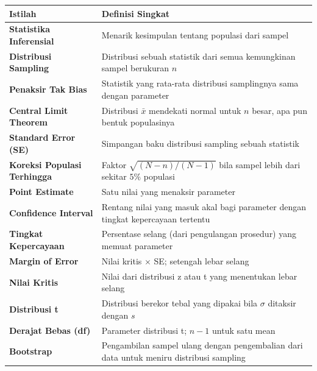 \documentclass[
  indonesian,
  letterpaper,
]{book}
\newcounter{none} %
\begin{document}
{\def\LTcaptype{none} %
\begin{longtable}[]{@{}
  >{\raggedright\arraybackslash}p{}
  >{\raggedright\arraybackslash}p{}@{}}
\toprule\noalign{}
\begin{minipage}[b]{\linewidth}\raggedright
Istilah
\end{minipage} & \begin{minipage}[b]{\linewidth}\raggedright
Definisi Singkat
\end{minipage} \\
\midrule\noalign{}
\endhead
\bottomrule\noalign{}
\endlastfoot
\textbf{Statistika Inferensial} & Menarik kesimpulan tentang populasi
dari sampel \\
\textbf{Distribusi Sampling} & Distribusi sebuah statistik dari semua
kemungkinan sampel berukuran \(n\) \\
\textbf{Penaksir Tak Bias} & Statistik yang rata-rata distribusi
samplingnya sama dengan parameter \\
\textbf{Central Limit Theorem} & Distribusi \(\bar{x}\) mendekati normal
untuk \(n\) besar, apa pun bentuk populasinya \\
\textbf{Standard Error (SE)} & Simpangan baku distribusi sampling sebuah
statistik \\
\textbf{Koreksi Populasi Terhingga} & Faktor \(\sqrt{(N - n)/(N - 1)}\)
bila sampel lebih dari sekitar \(5\%\) populasi \\
\textbf{Point Estimate} & Satu nilai yang menaksir parameter \\
\textbf{Confidence Interval} & Rentang nilai yang masuk akal bagi
parameter dengan tingkat kepercayaan tertentu \\
\textbf{Tingkat Kepercayaan} & Persentase selang (dari pengulangan
prosedur) yang memuat parameter \\
\textbf{Margin of Error} & Nilai kritis \(\times\) SE; setengah lebar
selang \\
\textbf{Nilai Kritis} & Nilai dari distribusi z atau t yang menentukan
lebar selang \\
\textbf{Distribusi t} & Distribusi berekor tebal yang dipakai bila
\(\sigma\) ditaksir dengan \(s\) \\
\textbf{Derajat Bebas (df)} & Parameter distribusi t; \(n - 1\) untuk
satu mean \\
\textbf{Bootstrap} & Pengambilan sampel ulang dengan pengembalian dari
data untuk meniru distribusi sampling \\
\end{longtable}
}
\end{document}
